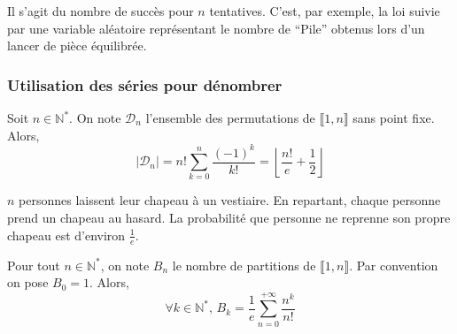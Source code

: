   \begin{remark}
    Il s'agit du nombre de succès pour $n$ tentatives.
    \newpar
    C'est, par exemple, la loi suivie par une variable aléatoire représentant le nombre de ``Pile'' obtenus lors d'un lancer de pièce équilibrée.
  \end{remark}

  \subsubsection{Utilisation des séries pour dénombrer}


  \begin{theorem}
    Soit $n \in \mathbb{N}^*$. On note $\mathcal{D}_n$ l'ensemble des permutations de $\llbracket 1, n \rrbracket$ sans point fixe. Alors,
    \[ \vert \mathcal{D}_n \vert = n! \sum_{k=0}^{n} \frac{(-1)^k}{k!} = \left\lfloor \frac{n!}{e} + \frac{1}{2} \right\rfloor \]
  \end{theorem}

  \begin{example}
    $n$ personnes laissent leur chapeau à un vestiaire. En repartant, chaque personne prend un chapeau au hasard. La probabilité que personne ne reprenne son propre chapeau est d'environ $\frac{1}{e}$.
  \end{example}


  \begin{theorem}
    Pour tout $n \in \mathbb{N}^*$, on note $B_n$ le nombre de partitions de $\llbracket 1, n \rrbracket$. Par convention on pose $B_0 = 1$. Alors,
    \[ \forall k \in \mathbb{N}^*, \, B_k = \frac{1}{e} \sum_{n=0}^{+\infty} \frac{n^k}{n!} \]
  \end{theorem}

